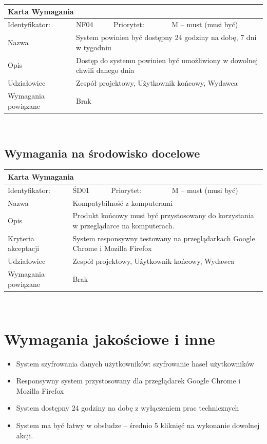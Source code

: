 \documentclass[a4paper,11pt]{report}
\begin{document}
		\newline
		\vspace*{0,2 cm}
		\newline
		\begin{tabular}{|p{3cm}|p{2cm}|p{2cm}|p{6cm}|}
		\hline
		\multicolumn{4}{|p{12 cm}|}{Karta Wymagania}\\
		\hline
		Identyfikator: & NF04 & Priorytet: & M – must (musi być)\\
		\hline
		Nazwa & \multicolumn{3}{|p{10 cm}|}{System powinien być dostępny 24 godziny na dobę, 7 dni w tygodniu}\\
		\hline
		Opis & \multicolumn{3}{|p{10 cm}|}{Dostęp do systemu powinien być umożliwiony w dowolnej chwili danego dnia}\\
		\hline
		Udziałowiec & \multicolumn{3}{|p{10 cm}|}{Zespół projektowy, Użytkownik końcowy, Wydawca}\\
		\hline
		Wymagania powiązane & \multicolumn{3}{|p{10 cm}|}{Brak}\\
		\hline
		\end{tabular}\\
	\subsection {Wymagania na środowisko docelowe}
	\begin{tabular}{|p{3cm}|p{2cm}|p{2cm}|p{6cm}|}
		\hline
		\multicolumn{4}{|p{12 cm}|}{Karta Wymagania}\\
		\hline
		Identyfikator: & ŚD01 & Priorytet: & M – must (musi być)\\
		\hline
		Nazwa & \multicolumn{3}{|p{10 cm}|}{Kompatybilność z komputerami}\\
		\hline
		Opis & \multicolumn{3}{|p{10 cm}|}{Produkt końcowy musi być przystosowany do korzystania w przeglądarce na komputerach.}\\
		\hline
		Kryteria akceptacji & \multicolumn{3}{|p{10 cm}|}{System responsywny testowany na przeglądarkach Google Chrome i Mozilla Firefox}\\
		\hline
		Udziałowiec & \multicolumn{3}{|p{10 cm}|}{Zespół projektowy, Użytkownik końcowy, Wydawca}\\
		\hline
		Wymagania powiązane & \multicolumn{3}{|p{10 cm}|}{Brak}\\
		\hline
		\end{tabular}\\
	\section {Wymagania jakościowe i inne}
	\begin{itemize}
		\item System szyfrowania danych użytkowników: szyfrowanie haseł użytkowników
		\item Responsywny system przystosowany dla przeglądarek Google Chrome i Mozilla Firefox
		\item System dostępny 24 godziny na dobę z wyłączeniem prac technicznych
		\item System ma być łatwy w obsłudze – średnio 5 kliknięć na wykonanie dowolnej akcji.
	\end{itemize}
\end{document}
